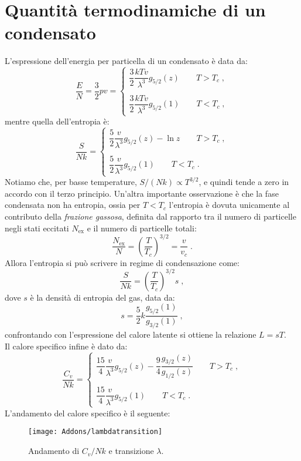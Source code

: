 \documentclass[10pt,a4paper]{report}
\theoremstyle{definition}
\numberwithin{equation}{section}
\begin{document}
\section{Quantità termodinamiche di un condensato}
L'espressione dell'energia per particella di un condensato è data da:
\begin{equation}
\frac{E}{N}=\frac{3}{2}pv=\begin{cases}
\dfrac{3}{2}\dfrac{kTv}{\lambda^3}g_{5/2}(z)\qquad T>T_c\;, \\
\\
\dfrac{3}{2}\dfrac{kTv}{\lambda^3}g_{5/2}(1)\qquad T<T_c\;,
\end{cases}
\end{equation}
mentre quella dell'entropia è:
\begin{equation}
\frac{S}{Nk}=\begin{cases}
\dfrac{5}{2}\dfrac{v}{\lambda^3}g_{5/2}(z)-\ln z\qquad T>T_c\;, \\
\\
\dfrac{5}{2}\dfrac{v}{\lambda^3}g_{5/2}(1)\qquad T<T_c\;.
\end{cases}
\end{equation}
Notiamo che, per basse temperature, $S/(Nk)\propto T^{3/2}$, e quindi tende a zero in accordo con il terzo principio. Un'altra importante osservazione è che la fase condensata non ha entropia, ossia per $T<T_c$ l'entropia è dovuta unicamente al contributo della \emph{frazione gassosa}, definita dal rapporto tra il numero di particelle negli stati eccitati $N_{\mathrm{ex}}$ e il numero di particelle totali:
\begin{equation}
\frac{N_{\mathrm{ex}}}{N}=\left(\frac{T}{T_c}\right)^{3/2}=\frac{v}{v_c}\;.
\end{equation}
Allora l'entropia si può scrivere in regime di condensazione come:
\begin{equation}
\frac{S}{Nk}=\left(\frac{T}{T_c}\right)^{3/2}s\;,
\end{equation}
dove $s$ è la densità di entropia del gas, data da:
\begin{equation}
s=\frac{5}{2}k\frac{g_{5/2}(1)}{g_{3/2}(1)}\;,
\end{equation}
confrontando con l'espressione del calore latente si ottiene la relazione $L=sT$. \\
Il calore specifico infine è dato da:
\begin{equation}
\frac{C_v}{Nk}=\begin{cases}
\dfrac{15}{4}\dfrac{v}{\lambda^3}g_{5/2}(z)-\dfrac{9}{4}\dfrac{g_{3/2}(z)}{g_{1/2}(z)}\qquad T>T_c \;,\\
\\
\dfrac{15}{4}\dfrac{v}{\lambda^3}g_{5/2}(1)\qquad T<T_c\;.
\end{cases}
\end{equation}
L'andamento del calore specifico è il seguente:
\begin{figure}[h]
\centering
\texttt{[image: Addons/lambdatransition]}
\caption{Andamento di $C_v/Nk$ e transizione $\lambda$.}
\end{figure}
\pagebreak
\end{document}
